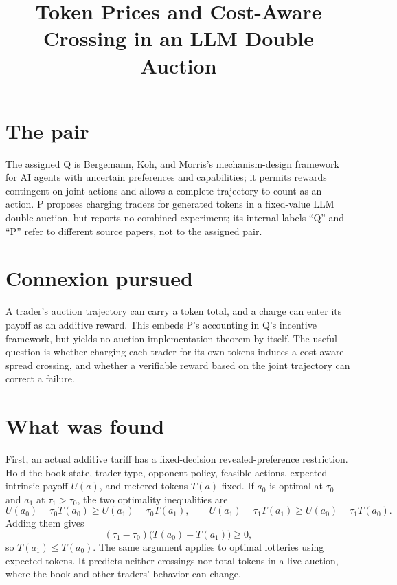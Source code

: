 \documentclass{article}
\title{Token Prices and Cost-Aware Crossing in an LLM Double Auction}
\begin{document}
\maketitle

\section*{The pair}

The assigned Q is Bergemann, Koh, and Morris's mechanism-design framework for AI agents with uncertain preferences and capabilities; it permits rewards contingent on joint actions and allows a complete trajectory to count as an action. P proposes charging traders for generated tokens in a fixed-value LLM double auction, but reports no combined experiment; its internal labels ``Q'' and ``P'' refer to different source papers, not to the assigned pair. 

\section*{Connexion pursued}

A trader's auction trajectory can carry a token total, and a charge can enter its payoff as an additive reward. This embeds P's accounting in Q's incentive framework, but yields no auction implementation theorem by itself. The useful question is whether charging each trader for its own tokens induces a cost-aware spread crossing, and whether a verifiable reward based on the joint trajectory can correct a failure. 

\section*{What was found}

First, an actual additive tariff has a fixed-decision revealed-preference restriction. Hold the book state, trader type, opponent policy, feasible actions, expected intrinsic payoff \(U(a)\), and metered tokens \(T(a)\) fixed. If \(a_0\) is optimal at \(\tau_0\) and \(a_1\) at \(\tau_1>\tau_0\), the two optimality inequalities are
\[
U(a_0)-\tau_0T(a_0)\geq U(a_1)-\tau_0T(a_1),
\qquad
U(a_1)-\tau_1T(a_1)\geq U(a_0)-\tau_1T(a_0).
\]
Adding them gives
\[
(\tau_1-\tau_0)\bigl(T(a_0)-T(a_1)\bigr)\geq0,
\]
so \(T(a_1)\leq T(a_0)\). The same argument applies to optimal lotteries using expected tokens. It predicts neither crossings nor total tokens in a live auction, where the book and other traders' behavior can change. 
\end{document}
